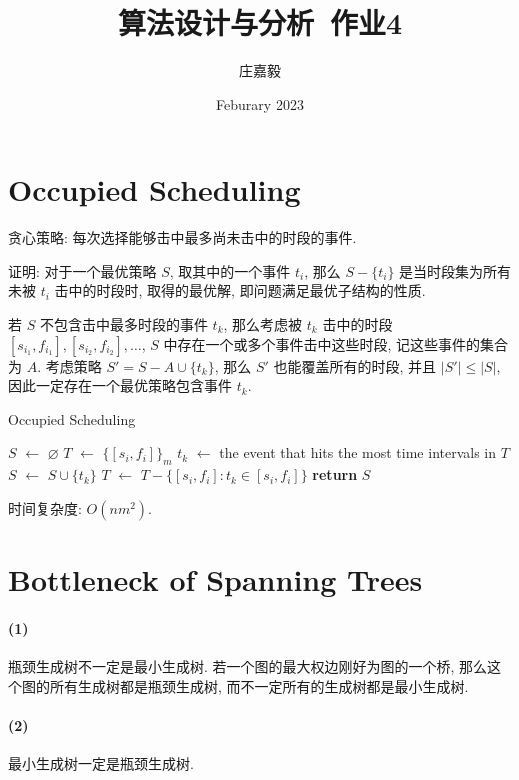 \documentclass{ctexart}
\title{算法设计与分析~作业4}
\author{庄嘉毅}
\date{Feburary 2023}
\newcommand{\Let}[1]{\State #1 $\gets$}
\newcommand{\Ret}[1]{\State \textbf{return} #1}
\begin{document}
\maketitle

\section{Occupied Scheduling}

贪心策略: 每次选择能够击中最多尚未击中的时段的事件.

证明: 对于一个最优策略 $S$, 取其中的一个事件 $t_i$, 那么 $S-\{t_i\}$ 是当时段集为所有未被 $t_i$ 击中的时段时, 取得的最优解, 即问题满足最优子结构的性质.

若 $S$ 不包含击中最多时段的事件 $t_k$, 那么考虑被 $t_k$ 击中的时段 $[s_{i_1}, f_{i_1}], [s_{i_2}, f_{i_2}], \ldots$, $S$ 中存在一个或多个事件击中这些时段, 记这些事件的集合为 $A$. 考虑策略 $S'=S-A\cup \{t_k\}$, 那么 $S'$ 也能覆盖所有的时段, 并且 $|S'|\le |S|$, 因此一定存在一个最优策略包含事件 $t_k$.

\begin{algorithm}[H]
    \caption{Occupied Scheduling}
    \begin{algorithmic}
        \Let{$S$} $\varnothing$
        \Let{$T$} $\{[s_i, f_i]\}_m$
            \Let{$t_k$} the event that hits the most time intervals in $T$
            \Let{$S$} $S\cup \{t_k\}$
            \Let{$T$} $T-\{[s_i, f_i]:t_k\in[s_i, f_i]\}$
        \EndWhile
        \Ret{$S$}
        \EndFunction
    \end{algorithmic}
\end{algorithm}

时间复杂度: $O(nm^2)$.

\section{Bottleneck of Spanning Trees}

\paragraph*{(1)} 瓶颈生成树不一定是最小生成树. 若一个图的最大权边刚好为图的一个桥, 那么这个图的所有生成树都是瓶颈生成树, 而不一定所有的生成树都是最小生成树.

\paragraph*{(2)} 最小生成树一定是瓶颈生成树.
\end{document}
